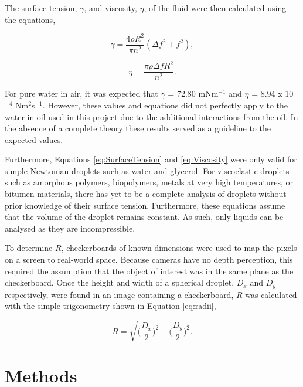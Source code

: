 \documentclass{physics_article_B}
\begin{document}
    The surface tension, $\gamma$, and viscosity, $\eta$, of the fluid were then calculated using the equations,
 
        \begin{equation} 
        \label{eq:SurfaceTension}
            \gamma = \frac{4\rho R^{2}}{\pi n^{2}}(\Delta f^{2} + f^{2}),
        \end{equation}
        
        \begin{equation} 
        \label{eq:Viscosity}
            \eta = \frac{\pi \rho \Delta f R^{2}}{n^{2}}.
        \end{equation}

    For pure water in air, it was expected that\cite{expected1} $\gamma$ = 72.80 mNm$^{-1}$ and\cite{expected2} $\eta$ = 8.94 x 10$^{-4}$ Nm$^{2}$s$^{-1}$. However, these values and equations did not perfectly apply to the water in oil used in this project due to the additional interactions from the oil. In the absence of a complete theory these results served as a guideline to the expected values. 
    
    Furthermore, Equations \ref{eq:SurfaceTension} and \ref{eq:Viscosity} were only valid for simple Newtonian droplets such as water and glycerol. For viscoelastic droplets such as amorphous polymers, biopolymers, metals at very high temperatures, or bitumen materials, there has yet to be a complete analysis of droplets without prior knowledge of their surface tension. Furthermore, these equations assume that the volume of the droplet remains constant. As such, only liquids can be analysed as they are incompressible.
    
    To determine $R$, checkerboards of known dimensions were used to map the pixels on a screen to real-world space. Because cameras have no depth perception, this required the assumption that the object of interest was in the same plane as the checkerboard\cite{CameraCalibration}. Once the height and width of a spherical droplet, $D_x$ and $D_y$ respectively, were found in an image containing a checkerboard, $R$ was calculated with the simple trigonometry shown in Equation \ref{eq:radii},
            
        \begin{equation}\label{eq:radii}
            R = \sqrt{\Big(\frac{D_x}{2}\Big)^2 + \Big(\frac{D_y}{2}\Big)^2}.
        \end{equation}

\section{Methods\label{sect:method}}
\end{document}
